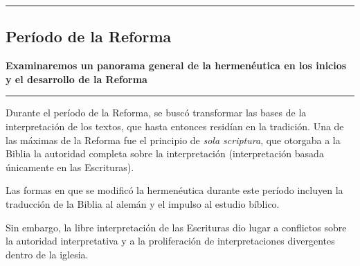 {\color{gray}\hrule}
\begin{center}
\section{Período de la Reforma}
\textbf{Examinaremos un panorama general de la hermenéutica en los inicios y el desarrollo de la Reforma}
\end{center}
{\color{gray}\hrule}
\begin{multicols}{2}

Durante el período de la Reforma, se buscó transformar las bases de la interpretación de los textos, que hasta entonces residían en la tradición. Una de las máximas de la Reforma fue el principio de \textit{sola scriptura}, que otorgaba a la Biblia la autoridad completa sobre la interpretación (interpretación basada únicamente en las Escrituras).

Las formas en que se modificó la hermenéutica durante este período incluyen la traducción de la Biblia al alemán y el impulso al estudio bíblico. 

Sin embargo, la libre interpretación de las Escrituras dio lugar a conflictos sobre la autoridad interpretativa y a la proliferación de interpretaciones divergentes dentro de la iglesia.

\end{multicols}
